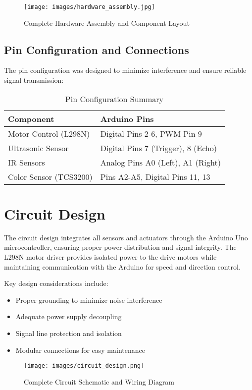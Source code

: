\documentclass[12pt,a4paper]{article}
\begin{document}
\begin{figure}[H]
    \centering
    \texttt{[image: images/hardware\_assembly.jpg]}
    \caption{Complete Hardware Assembly and Component Layout}
    \label{fig:hardware_assembly}
\end{figure}

\subsection{Pin Configuration and Connections}

The pin configuration was designed to minimize interference and ensure reliable signal transmission:

\begin{table}[H]
\centering
\begin{tabular}{@{}ll@{}}
\toprule
\textbf{Component} & \textbf{Arduino Pins} \\
\midrule
Motor Control (L298N) & Digital Pins 2-6, PWM Pin 9 \\
Ultrasonic Sensor & Digital Pins 7 (Trigger), 8 (Echo) \\
IR Sensors & Analog Pins A0 (Left), A1 (Right) \\
Color Sensor (TCS3200) & Pins A2-A5, Digital Pins 11, 13 \\
\bottomrule
\end{tabular}
\caption{Pin Configuration Summary}
\label{tab:pins}
\end{table}

\section{Circuit Design}

The circuit design integrates all sensors and actuators through the Arduino Uno microcontroller, ensuring proper power distribution and signal integrity. The L298N motor driver provides isolated power to the drive motors while maintaining communication with the Arduino for speed and direction control.

Key design considerations include:
\begin{itemize}
    \item Proper grounding to minimize noise interference
    \item Adequate power supply decoupling
    \item Signal line protection and isolation
    \item Modular connections for easy maintenance
\end{itemize}
\begin{figure}[H]
    \centering
    \texttt{[image: images/circuit\_design.png]}
    \caption{Complete Circuit Schematic and Wiring Diagram}
    \label{fig:circuit_design}
\end{figure}
\end{document}
